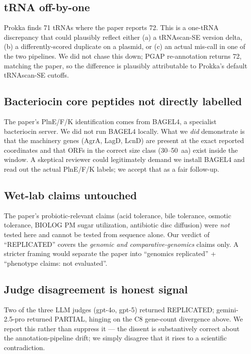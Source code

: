 \documentclass[11pt,a4paper]{article}
\begin{document}
\subsection{tRNA off-by-one}
Prokka finds 71 tRNAs where the paper reports 72. This is a one-tRNA
discrepancy that could plausibly reflect either (a) a tRNAscan-SE version
delta, (b) a differently-scored duplicate on a plasmid, or (c) an actual
mis-call in one of the two pipelines. We did not chase this down; PGAP
re-annotation returns 72, matching the paper, so the difference is
plausibly attributable to Prokka's default tRNAscan-SE cutoffs.

\subsection{Bacteriocin core peptides not directly labelled}
The paper's PlnE/F/K identification comes from BAGEL4, a specialist
bacteriocin server. We did not run BAGEL4 locally. What we \emph{did}
demonstrate is that the machinery genes (AgrA, LagD, LcnD) are present at
the exact reported coordinates and that ORFs in the correct size class
(30--50~aa) exist inside the window. A skeptical reviewer could legitimately
demand we install BAGEL4 and read out the actual PlnE/F/K labels;
we accept that as a fair follow-up.

\subsection{Wet-lab claims untouched}
The paper's probiotic-relevant claims (acid tolerance, bile tolerance,
osmotic tolerance, BIOLOG PM sugar utilization, antibiotic disc diffusion)
were \emph{not} tested here and cannot be tested from sequence alone. Our
verdict of ``REPLICATED'' covers the \emph{genomic and comparative-genomics}
claims only. A stricter framing would separate the paper into ``genomics
replicated'' + ``phenotype claims: not evaluated''.

\subsection{Judge disagreement is honest signal}
Two of the three LLM judges (gpt-4o, gpt-5) returned REPLICATED;
gemini-2.5-pro returned PARTIAL, hinging on the C8 gene-count divergence
above. We report this rather than suppress it --- the dissent is
substantively correct about the annotation-pipeline drift; we simply
disagree that it rises to a scientific contradiction.
\end{document}
